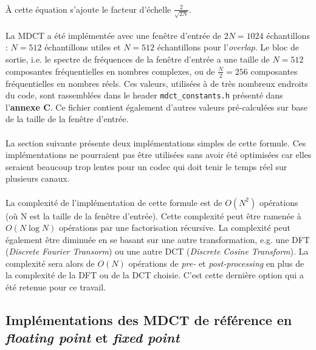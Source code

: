 \documentclass{article}
\begin{document}
    \paragraph{}
    À cette équation s'ajoute le facteur d'échelle $\frac{2}{\sqrt{2N}}$.

    \paragraph{}
    La MDCT a été implémentée avec une fenêtre d'entrée de $2N = 1024$ échantillons : $N = 512$ échantillons utiles et $N = 512$ échantillons pour l'\emph{overlap}. Le bloc de sortie, i.e. le spectre de fréquences de la fenêtre d'entrée a une taille de $N = 512$ composantes fréquentielles en nombres complexes, ou de $\frac{N}{2} = 256$ composantes fréquentielles en nombres réels. Ces valeurs, utilisées à de très nombreux endroits du code, sont rassemblées dans le header \texttt{mdct\_constants.h} présenté dans l'\textbf{annexe C}. Ce fichier contient également d'autres valeurs pré-calculées sur base de la taille de la fenêtre d'entrée.

    \paragraph{}
    La section suivante présente deux implémentations simples de cette formule. Ces implémentations ne pourraient pas être utilisées sans avoir été optimisées car elles seraient beaucoup trop lentes pour un codec qui doit tenir le temps réel sur plusieurs canaux.

    \paragraph{}
    La complexité de l'implémentation de cette formule est de $O(N^2)$ opérations (où N est la taille de la fenêtre d'entrée). Cette complexité peut être ramenée à $O(N \log N)$ opérations par une factorisation récursive. La complexité peut également être diminuée en se basant sur une autre transformation, e.g. une DFT (\emph{Discrete Fourier Transorm}) ou une autre DCT (\emph{Discrete Cosine Transform}). La complexité sera alors de $O(N)$ opérations de \emph{pre-} et \emph{post-processing} en plus de la complexité de la DFT ou de la DCT choisie\cite{wiki:MDCT}. C'est cette dernière option qui a été retenue pour ce travail.


    \subsection{Implémentations des MDCT de référence en \emph{floating point} et \emph{fixed point}}
\end{document}
